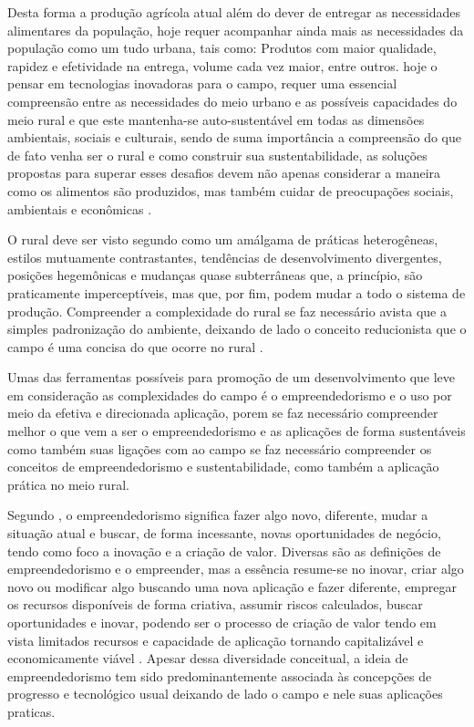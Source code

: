 Desta forma a produção agrícola atual além do dever de entregar as necessidades alimentares da população, hoje requer acompanhar ainda mais as necessidades da população como um tudo urbana, tais como: Produtos com maior qualidade, rapidez e efetividade na entrega, volume cada vez maior, entre outros. hoje o pensar em tecnologias inovadoras para o campo, requer uma essencial compreensão entre as necessidades do meio urbano e as possíveis capacidades do meio rural e que este mantenha-se auto-sustentável em todas as dimensões ambientais, sociais e culturais, sendo de suma importância a compreensão do que de fato venha ser o rural e como construir sua sustentabilidade, as soluções propostas para superar esses desafios devem não apenas considerar a maneira como os alimentos são produzidos, mas também cuidar de preocupações sociais, ambientais e econômicas \cite{noauthor_achieving_2020}. 

O rural deve ser visto segundo \cite{kageyama_desenvolvimento_2008} como um amálgama de práticas heterogêneas, estilos mutuamente contrastantes, tendências de desenvolvimento divergentes, posições hegemônicas e mudanças quase subterrâneas que, a princípio, são praticamente imperceptíveis, mas que, por fim, podem mudar a todo o sistema de produção. Compreender a complexidade do rural se faz necessário avista que a simples padronização do ambiente, deixando de lado o conceito reducionista que o campo é uma concisa do que ocorre no rural \cite{van_der_ploeg_trajetorias_2011}. 

Umas das ferramentas possíveis para promoção de um desenvolvimento que leve em consideração as complexidades do campo é o empreendedorismo e o uso por meio da efetiva e direcionada aplicação, porem se faz necessário compreender melhor o que vem a ser o empreendedorismo e as aplicações de forma sustentáveis como também suas ligações com ao campo se faz necessário compreender os conceitos de empreendedorismo e sustentabilidade, como também a aplicação prática no meio rural. 

Segundo , o empreendedorismo significa fazer algo novo, diferente, mudar a situação atual e buscar, de forma incessante, novas oportunidades de negócio, tendo como foco a inovação e a criação de valor. Diversas são as definições de empreendedorismo e o empreender, mas a essência resume-se no inovar, criar algo novo ou modificar algo buscando uma nova aplicação e fazer diferente, empregar os recursos disponíveis de forma criativa, assumir riscos calculados, buscar oportunidades e inovar, podendo ser o processo de criação de valor tendo em vista limitados recursos e capacidade de aplicação tornando capitalizável e economicamente viável \cite{costa_empreendedorismo_2006, stevenson_new_1989, lopes_educacao_2010}. Apesar dessa diversidade conceitual, a ideia de empreendedorismo tem sido predominantemente associada às concepções de progresso e tecnológico usual deixando de lado o campo e nele suas aplicações praticas.  

